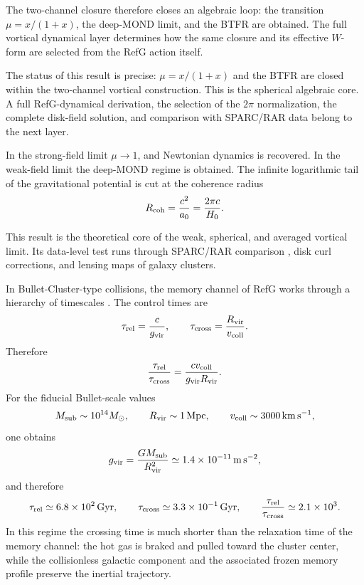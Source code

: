 \documentclass[12pt]{article}
\begin{document}
The two-channel closure therefore closes an algebraic loop: the transition $\mu=x/(1+x)$, the deep-MOND limit, and the BTFR are obtained. The full vortical dynamical layer determines how the same closure and its effective $W$-form are selected from the RefG action itself.

The status of this result is precise: $\mu=x/(1+x)$ and the BTFR are closed within the two-channel vortical construction. This is the spherical algebraic core. A full RefG-dynamical derivation, the selection of the $2\pi$ normalization, the complete disk-field solution, and comparison with SPARC/RAR data belong to the next layer.

In the strong-field limit $\mu\to1$, and Newtonian dynamics is recovered. In the weak-field limit the deep-MOND regime is obtained. The infinite logarithmic tail of the gravitational potential is cut at the coherence radius
\begin{equation}
R_{\rm coh}=\frac{c^2}{a_0}=\frac{2\pi c}{H_0}.
\end{equation}

This result is the theoretical core of the weak, spherical, and averaged vortical limit. Its data-level test runs through SPARC/RAR comparison \cite{Lelli2016,McGaugh2016}, disk curl corrections, and lensing maps of galaxy clusters.

In Bullet-Cluster-type collisions, the memory channel of RefG works through a hierarchy of timescales \cite{Clowe2006}. The control times are
\begin{equation}
\tau_{\rm rel}=\frac{c}{g_{\rm vir}},\qquad
\tau_{\rm cross}=\frac{R_{\rm vir}}{v_{\rm coll}} .
\end{equation}
Therefore
\begin{equation}
\frac{\tau_{\rm rel}}{\tau_{\rm cross}}
=\frac{cv_{\rm coll}}{g_{\rm vir}R_{\rm vir}} .
\end{equation}
For the fiducial Bullet-scale values
\begin{equation}
M_{\rm sub}\sim10^{14}M_\odot,\qquad
R_{\rm vir}\sim1\,{\rm Mpc},\qquad
v_{\rm coll}\sim3000\,{\rm km\,s^{-1}},
\end{equation}
one obtains
\begin{equation}
g_{\rm vir}=\frac{GM_{\rm sub}}{R_{\rm vir}^2}\simeq1.4\times10^{-11}\,{\rm m\,s^{-2}},
\end{equation}
and therefore
\begin{equation}
\tau_{\rm rel}\simeq6.8\times10^2\,{\rm Gyr},\qquad
\tau_{\rm cross}\simeq3.3\times10^{-1}\,{\rm Gyr},\qquad
\frac{\tau_{\rm rel}}{\tau_{\rm cross}}\simeq2.1\times10^3 .
\end{equation}
In this regime the crossing time is much shorter than the relaxation time of the memory channel: the hot gas is braked and pulled toward the cluster center, while the collisionless galactic component and the associated frozen memory profile preserve the inertial trajectory.
\end{document}
